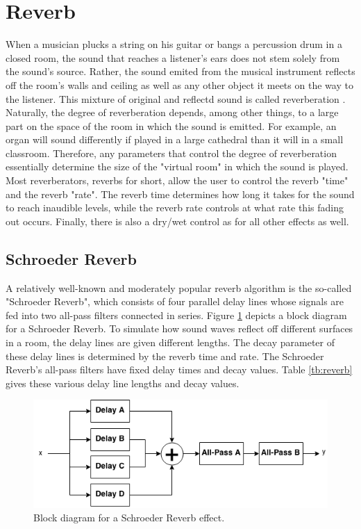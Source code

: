 \documentclass[12pt,twoside]{report}
\begin{document}
\section{Reverb}

When a musician plucks a string on his guitar or bangs a percussion drum in a closed room, the sound that reaches a listener's ears does not stem solely from the sound's source. Rather, the sound emited from the musical instrument reflects off the room's walls and ceiling as well as any other object it meets on the way to the listener. This mixture of original and reflectd sound is called reverberation . Naturally, the degree of reverberation depends, among other things, to a large part on the space of the room in which the sound is emitted. For example, an organ will sound differently if played in a large cathedral than it will in a small classroom. Therefore, any parameters that control the degree of reverberation essentially determine the size of the "virtual room" in which the sound is played. Most reverberators, reverbs for short, allow the user to control the reverb "time" and the reverb "rate". The reverb time determines how long it takes for the sound to reach inaudible levels, while the reverb rate controls at what rate this fading out occurs. Finally, there is also a dry/wet control as for all other effects as well.

\subsection{Schroeder Reverb}

A relatively well-known and moderately popular reverb algorithm is the so-called "Schroeder Reverb", which consists of four parallel delay lines whose signals are fed into two all-pass filters connected in series. Figure \ref{fig:reverb} depicts a block diagram for a Schroeder Reverb. To simulate how sound waves reflect off different surfaces in a room, the delay lines are given different lengths. The decay parameter of these delay lines is determined by the reverb time and rate. The Schroeder Reverb's all-pass filters have fixed delay times and decay values. Table \ref{tb:reverb} gives these various delay line lengths and decay values. 

\begin{figure}[hb!]
  \includegraphics[scale=0.7]{img/reverb}
  \caption{Block diagram for a Schroeder Reverb effect.}
  \label{fig:reverb}
\end{figure}
\end{document}
